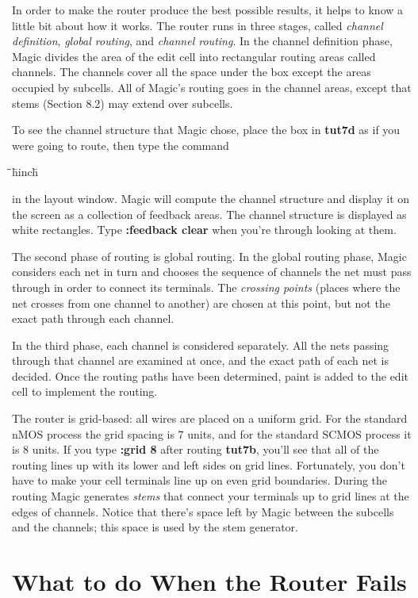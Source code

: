\documentclass[letterpaper,twoside,12pt]{article}
\def\hinch{\hspace*{0.5in}}
\def\starti{\begin{center}\begin{tabbing}\hinch\=\hinch\=\hinch\=hinch\hinch\=\kill}
\def\endi{\end{tabbing}\end{center}}
\def\ii{\>\>\>}
\begin{document}
In order to make the router produce the best possible results, it
helps to know a little bit about how it works.
The router runs in three stages, called {\itshape channel definition},
{\itshape global routing}, and {\itshape channel routing}.  In the channel
definition phase, Magic divides the area of the edit cell
into rectangular routing areas called channels.  The channels
cover all the space under the box except the areas occupied by
subcells.
All of Magic's routing goes in the channel areas, except that
stems (Section 8.2) may extend over subcells.

To see the channel structure that Magic chose, place
the box in {\bfseries tut7d} as if you were going to route, then type the command

\starti
   \ii {\bfseries :channel}
\endi

in the layout window.
Magic will compute the channel structure
and display it on the screen as a collection of feedback areas.
The channel structure is displayed as white rectangles.
Type {\bfseries :feedback clear} when you're through looking at them.

The second phase of routing is global routing.  In the global
routing phase, Magic considers each net in turn and chooses
the sequence of channels the net must pass through in order
to connect its terminals.  The {\itshape crossing points} (places
where the net crosses from one channel to another) are chosen
at this point, but not the exact path through each channel.

In the third phase, each channel is considered separately.
All the nets passing through that channel are examined at once,
and the exact path of each net is decided.  Once the routing
paths have been determined, paint is added to the edit cell
to implement the routing.

The router is grid-based:  all wires are placed on
a uniform grid.  For the standard nMOS process the grid spacing
is 7 units, and for the standard SCMOS process it is 8 units.
If you type {\bfseries :grid 8} after routing {\bfseries tut7b}, you'll
see that all of the routing lines up with its lower and left
sides on grid lines.  Fortunately, you don't have to make
your cell terminals line up on even grid boundaries.  During
the routing Magic generates {\itshape stems} that connect your
terminals up to grid lines at the edges of channels.  Notice
that there's space left by Magic between the subcells and
the channels;  this space is used by the stem generator.


\section{What to do When the Router Fails}
\end{document}

